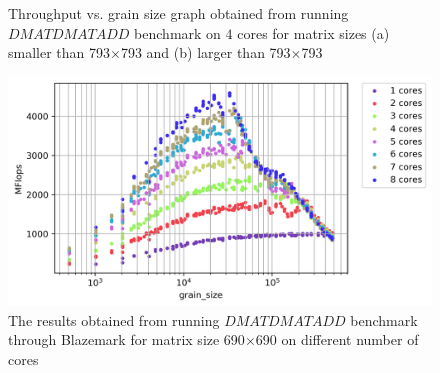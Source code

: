 \begin{figure}[H]

	\caption{Throughput vs. grain size graph obtained from running $DMATDMATADD$ benchmark  on $4$ cores for matrix sizes (a) smaller than 793$\times$793 and (b) larger than 793$\times$793}
	\label{fig8}	
\end{figure}

\begin{figure}[H]
	\centering
	\hspace*{-2cm}\includegraphics[scale=.75]{images/fig13.png}
	\caption{The results obtained from running $DMATDMATADD$ benchmark through Blazemark for matrix size 690$\times$690 on different number of cores}	
	\label{fig9}
\end{figure}

